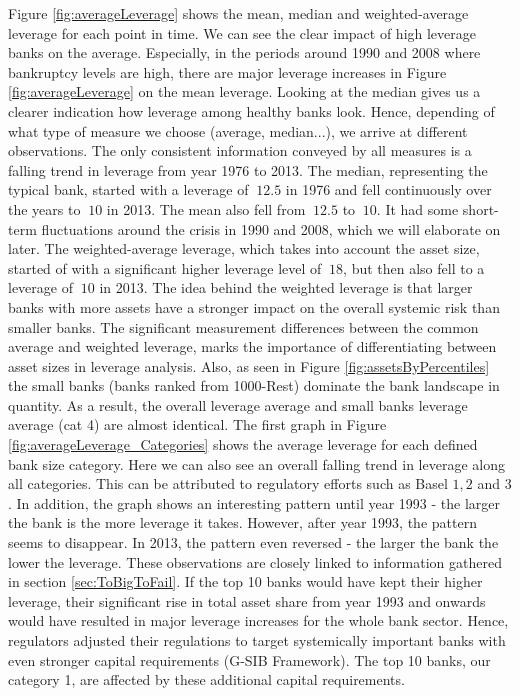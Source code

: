 \documentclass[12pt, a4paper]{article} %
\begin{document}
Figure \ref{fig:averageLeverage} shows the mean, median and weighted-average leverage for each point in time. We can see the clear impact of high leverage banks on the average. Especially, in the periods around 1990 and 2008 where bankruptcy levels are high, there are major leverage increases in Figure \ref{fig:averageLeverage} on the mean leverage. Looking at the median gives us a clearer indication how leverage among healthy banks look. Hence, depending of what type of measure we choose (average, median...), we arrive at different observations. The only consistent information conveyed by all measures is a falling trend in leverage from year 1976 to 2013. The median, representing the typical bank, started with a leverage of $~12.5$ in 1976 and fell continuously over the years to $~10$ in 2013. The mean also fell from $~12.5$ to $~10$. It had some short-term fluctuations around the crisis in 1990 and 2008, which we will elaborate on later. The weighted-average leverage, which takes into account the asset size, started of with a significant higher leverage level of $~18$, but then also fell to a leverage of $~10$ in 2013. The idea behind the weighted leverage is that larger banks with more assets have a stronger impact on the overall systemic risk than smaller banks. The significant measurement differences between the common average and weighted leverage, marks the importance of differentiating between asset sizes in leverage analysis. Also, as seen in Figure \ref{fig:assetsByPercentiles} the small banks (banks ranked from 1000-Rest) dominate the bank landscape in quantity. As a result, the overall leverage average and small banks leverage average (cat 4) are almost identical. 
The first graph in Figure \ref{fig:averageLeverage_Categories} shows the average leverage for each defined bank size category. Here we can also see an overall falling trend in leverage along all categories. This can be attributed to regulatory efforts such as Basel $1,2$ and $3$. In addition, the graph shows an interesting pattern until year 1993 - the larger the bank is the more leverage it takes. However, after year 1993, the pattern seems to disappear. In 2013, the pattern even reversed - the larger the bank the lower the leverage. These observations are closely linked to information gathered in section \ref{sec:ToBigToFail}. If the top 10 banks would have kept their higher leverage, their significant rise in total asset share from year 1993 and onwards would have resulted in major leverage increases for the whole bank sector. Hence, regulators adjusted their regulations to target systemically important banks with even stronger capital requirements (G-SIB Framework). The top 10 banks, our category 1, are affected by these additional capital requirements.
\end{document}

